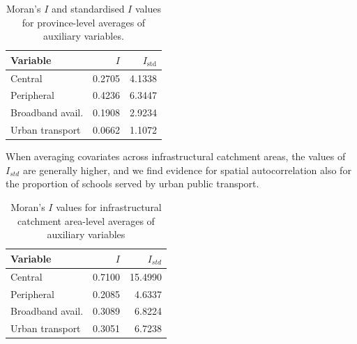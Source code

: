 \documentclass[openany]{book}
\begin{document}
\begin{table}[ht]
\centering
\begin{tabular}{lrr}
Variable & $I$ & $I_\mathrm{std}$  \\ \hline
Central & 0.2705 & 4.1338   \\  
Peripheral & 0.4236 & 6.3447   \\
Broadband avail. & 0.1908 & 2.9234 \\ 
Urban transport & 0.0662 & 1.1072  \\  
\hline
\end{tabular}
\caption{Moran's $I$ and standardised $I$ values for province-level averages of auxiliary variables.}
\label{tab:MoranProv}
\end{table}

 When averaging covariates across infrastructural catchment areas, the values of $I_{std}$ are generally higher, and we find evidence for spatial autocorrelation also for the proportion of schools served by urban public transport.



\begin{table}[ht]
\centering
\begin{tabular}{lrr}
Variable & $I$ & $I_{std}$             \\ \hline
Central & 0.7100 & 15.4990             \\
Peripheral & 0.2085  & 4.6337         \\ %
Broadband avail. & 0.3089  & 6.8224  \\
Urban transport &  0.3051 & 6.7238    \\
\hline
\end{tabular}
\caption{Moran's $I$ values for infrastructural catchment area-level averages of auxiliary variables}
\label{tab:MoranPole}
\end{table}

\end{document}
